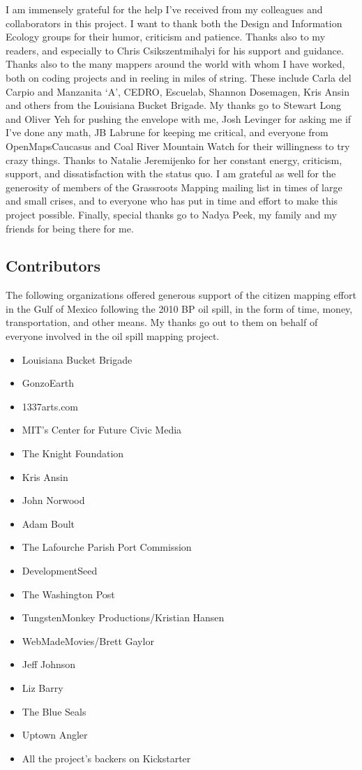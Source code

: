 \documentclass[11pt,oneside,notitlepage]{report}
\begin{document}
{{I am immensely grateful for the help I've received from my colleagues and collaborators in this project. I want to thank both the Design and Information Ecology groups for their humor, criticism and patience. Thanks also to my readers, and especially to Chris Csikszentmihalyi for his support and guidance. Thanks also to the many mappers around the world with whom I have worked, both on coding projects and in reeling in miles of string. These include Carla del Carpio and Manzanita `A', CEDRO, Escuelab, Shannon Dosemagen, Kris Ansin and others from the Louisiana Bucket Brigade. My thanks go to Stewart Long and Oliver Yeh for pushing the envelope with me, Josh Levinger for asking me if I've done any math, JB Labrune for keeping me critical, and everyone from OpenMapsCaucasus and Coal River Mountain Watch for their willingness to try crazy things. Thanks to Natalie Jeremijenko for her constant energy, criticism, support, and dissatisfaction with the status quo. I am grateful as well for the generosity of members of the Grassroots Mapping mailing list in times of large and small crises, and to everyone who has put in time and effort to make this project possible. Finally, special thanks go to Nadya Peek, my family and my friends for being there for me.  

\vspace{10px}
\subsection*{Contributors}
\label{sec:donors}

The following organizations offered generous support of the citizen mapping effort in the Gulf of Mexico following the 2010 BP oil spill, in the form of time, money, transportation, and other means. My thanks go out to them on behalf of everyone involved in the oil spill mapping project. 

\begin{itemize}
\setlength{\itemsep}{0.7pt}
\item{Louisiana Bucket Brigade}
\item{GonzoEarth}
\item{1337arts.com}
\item{MIT's Center for Future Civic Media}
\item{The Knight Foundation}
\item{Kris Ansin}
\item{John Norwood}
\item{Adam Boult}
\item{The Lafourche Parish Port Commission}
\item{DevelopmentSeed}
\item{The Washington Post}
\item{TungstenMonkey Productions/Kristian Hansen}
\item{WebMadeMovies/Brett Gaylor}
\item{Jeff Johnson}
\item{Liz Barry}
\item{The Blue Seals}
\item{Uptown Angler}
\item{All the project's backers on Kickstarter}
\end{itemize}

}}
\end{document}
